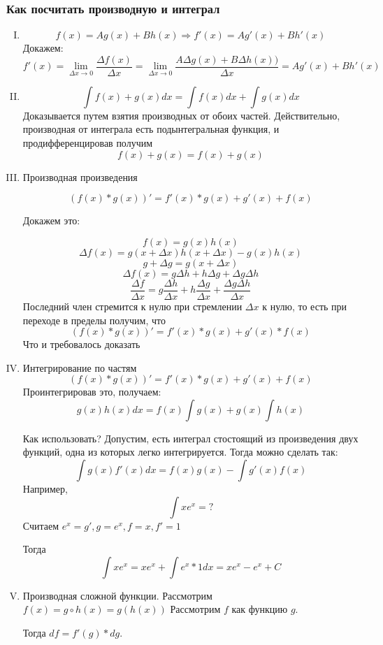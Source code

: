 \documentclass{article}
\begin{document}
\subsubsection{Как посчитать производную и интеграл}

\begin{enumerate}[I.]
\item{$$f(x) = Ag(x) + Bh(x) \Rightarrow
f'(x) = Ag'(x) + Bh'(x)$$
Докажем:
$$f'(x) = \lim_{\Delta x \to 0}\frac{\Delta f(x)}{\Delta x} = \lim_{\Delta x \to 0}\frac{A\Delta g(x) + B\Delta h(x))}{\Delta x} = Ag'(x) + Bh'(x) $$
}

\item{
$$\int f(x)+g(x)dx = \int f(x)dx + \int g(x)dx$$
Доказывается путем взятия производных от обоих частей. Действительно, производная от интеграла есть подынтегральная функция, и продифференцировав получим
$$f(x)+g(x) = f(x) + g(x)$$
}

\item{
Производная произведения

$$(f(x)*g(x))' = f'(x)*g(x) + g'(x)+f(x)$$

Докажем это:

$$f(x) = g(x)h(x)$$
$$\Delta f(x) = g(x+\Delta x)h(x + \Delta x) - g(x)h(x)$$
$$g+\Delta g = g(x+\Delta x)$$
$$\Delta f(x) = g\Delta h + h \Delta g + \Delta g \Delta h$$
$$\frac{\Delta f}{\Delta x} = g\frac{\Delta h}{\Delta x} + h\frac{\Delta g}{\Delta x} + \frac{\Delta g \Delta h}{\Delta x}$$
Последний член стремится к нулю при стремлении $\Delta x$ к нулю, то есть при переходе в пределы получим, что$$(f(x)*g(x))' = f'(x)*g(x) + g'(x)*f(x)$$
Что и требовалось доказать
}

\item{
Интегрирование по частям
$$(f(x)*g(x))' = f'(x)*g(x) + g'(x)+f(x)$$
Проинтегрировав это, получаем:
$$g(x)h(x)dx = f(x)\int g(x) + g(x)\int{h(x)}$$

Как использовать? Допустим, есть интеграл стостоящий из произведения двух функций, одна из которых легко интегрируется. Тогда можно сделать так:
$$\int g(x)f'(x) dx = f(x)g(x) - \int g'(x)f(x)$$
Например, 
$$\int xe^x = ?$$
Считаем $e^x = g', g=e^x, f = x, f'=1$

Тогда
$$\int xe^x = xe^x + \int e^x*1 dx = xe^x - e^x + C$$
}

\item{
Производная сложной функции. Рассмотрим $f(x)=g \circ h(x) = g(h(x))$
Рассмотрим $f$ как функцию $g$. 

Тогда $df = f'(g)*dg$. 

}
\end{enumerate}
\end{document}
